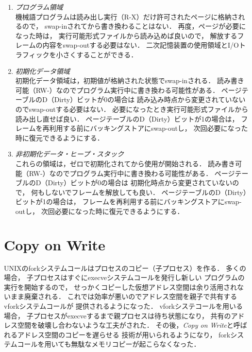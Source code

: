 \begin{enumerate}
\item \emph{プログラム領域} \\
機械語プログラムは読み出し実行（R-X）だけ許可されたページに格納されるので，
swap-inされてから書き換わることはない．
再度，ページが必要になった時は，
実行可能形式ファイルから読み込めば良いので，
解放するフレームの内容をswap-outする必要はない．
二次記憶装置の使用領域とI/Oトラフィックを小さくすることができる．

\item \emph{初期化データ領域} \\
初期化データ領域は，初期値が格納された状態でswap-inされる．
読み書き可能（RW-）なのでプログラム実行中に書き換わる可能性がある．
ページテーブルのD（Dirty）ビットが0の場合は
読み込み時点から変更されていないのでswap-outする必要はない．
必要になったとき実行可能形式ファイルから読み出し直せば良い．
ページテーブルのD（Dirty）ビットが1の場合は，
フレームを再利用する前にバッキングストアにswap-outし，
次回必要になった時に復元できるようにする．

\item \emph{非初期化データ・ヒープ・スタック} \\
これらの領域は，ゼロで初期化されてから使用が開始される．
読み書き可能（RW-）なのでプログラム実行中に書き換わる可能性がある．
ページテーブルのD（Dirty）ビットが0の場合は
初期化時点から変更されていないので，
何もしないでフレームを解放しても良い．
ページテーブルのD（Dirty）ビットが1の場合は，
フレームを再利用する前にバッキングストアにswap-outし，
次回必要になった時に復元できるようにする．
\end{enumerate}

\section{Copy on Write}
UNIXのforkシステムコールはプロセスのコピー（子プロセス）を作る．
多くの場合，
子プロセスはすぐにexecveシステムコールを発行し新しい
プログラムの実行を開始するので，
せっかくコピーした仮想アドレス空間は余り活用されないまま廃棄される．
これでは効率が悪いのでアドレス空間を親子で共有するvforkシステムコールが
提供されるようになった．
vforkシステコールを用いる場合，
子プロセスがexecveするまで親プロセスは待ち状態になり，
共有のアドレス空間を破壊し合わないような工夫がされた．
その後，\emph{Copy on Write}と呼ばれるアドレス空間のコピーを遅らせる
技術が用いられるようになり，
forkシステムコールを用いても無駄なメモリコピーが起こらなくなった．

